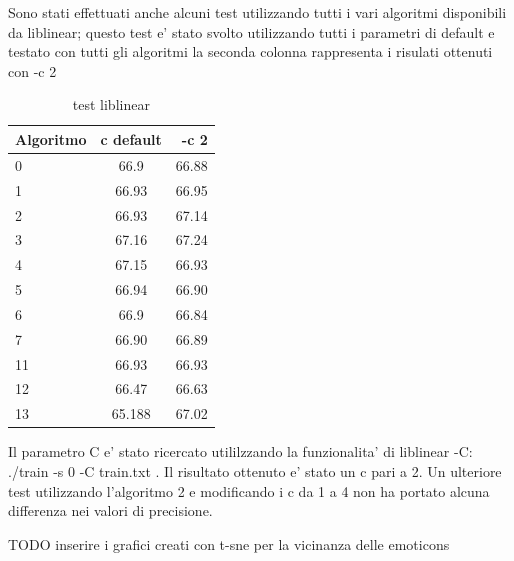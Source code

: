 \documentclass[a4paper,11pt]{book}
\theoremstyle{definition}
\begin{document}
Sono stati effettuati anche alcuni test utilizzando tutti i vari algoritmi disponibili da liblinear; questo test e' stato svolto utilizzando tutti i parametri di default e testato con tutti gli algoritmi la seconda colonna rappresenta i risulati ottenuti con -c 2
\begin{table}[h]
\begin{center}
\begin{tabular}{|l|c|r|}
\hline
Algoritmo & c  default & -c 2 \\
\hline
\hline
0 & 66.9 & 66.88\\
\hline
1 & 66.93 & 66.95\\
\hline
2 & 66.93 & 67.14\\
\hline
3 & 67.16 & 67.24\\
\hline
4 & 67.15 & 66.93\\
\hline
5 & 66.94 & 66.90\\
\hline
6 & 66.9 & 66.84\\
\hline
7 & 66.90 & 66.89\\
\hline
11 & 66.93 & 66.93\\
\hline
12 & 66.47 & 66.63\\
\hline
13 & 65.188 & 67.02\\
\hline
\end{tabular}
\end{center}
\caption{test liblinear}
\label{tab:liblineraTest1}
\end{table}

Il parametro C e' stato ricercato utililzzando la funzionalita' di liblinear -C: ./train -s 0 -C train.txt . Il risultato ottenuto e' stato un c pari a 2. Un ulteriore test utilizzando l'algoritmo 2 e modificando i c da 1 a 4 non ha portato alcuna differenza nei valori di precisione.

TODO inserire i grafici creati con t-sne per la vicinanza delle emoticons
\end{document}

